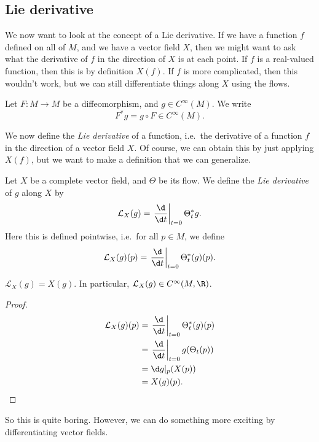 \documentclass[a4paper]{article}
\begin{document}
\subsection{Lie derivative}
We now want to look at the concept of a Lie derivative. If we have a function $f$ defined on all of $M$, and we have a vector field $X$, then we might want to ask what the derivative of $f$ in the direction of $X$ is at each point. If $f$ is a real-valued function, then this is by definition $X(f)$. If $f$ is more complicated, then this wouldn't work, but we can still differentiate things along $X$ using the flows.

\begin{notation}
  Let $F: M \to M$ be a diffeomorphism, and $g \in C^\infty(M)$. We write
  \[
    F^* g = g \circ F \in C^\infty(M).
\]
\end{notation}

We now define the \emph{Lie derivative} of a function, i.e.\ the derivative of a function $f$ in the direction of a vector field $X$. Of course, we can obtain this by just applying $X(f)$, but we want to make a definition that we can generalize.

\begin{defi}
  Let $X$ be a complete vector field, and $\Theta$ be its flow. We define the \emph{Lie derivative} of $g$ along $X$ by
  \[
    \mathcal{L}_X(g) = \left.\frac{\d}{\d t} \right|_{t = 0} \Theta_t^* g.
  \]
  Here this is defined pointwise, i.e.\ for all $p \in M$, we define
  \[
    \mathcal{L}_X(g)(p) = \left.\frac{\d}{\d t}\right|_{t = 0} \Theta_t^*(g)(p).
  \]
\end{defi}

\begin{lemma}
  $\mathcal{L}_X(g) = X(g)$. In particular, $\mathcal{L}_X(g) \in C^\infty(M, \R)$.
\end{lemma}

\begin{proof}
  \begin{align*}
    \mathcal{L}_X(g)(p) &= \left.\frac{\d}{\d t}\right|_{t = 0} \Theta_t^*(g)(p) \\
    &= \left.\frac{\d}{\d t}\right|_{t = 0} g(\Theta_t(p)) \\
    &= \d g|_p(X(p))\\
    &= X(g)(p). \qedhere
  \end{align*}
\end{proof}

So this is quite boring. However, we can do something more exciting by differentiating vector fields.
\end{document}
